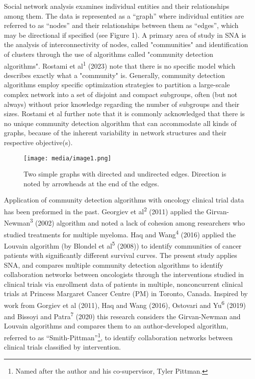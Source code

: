 \documentclass{article}
\begin{document}
Social network analysis examines individual entities and their
relationships among them. The data is represented as a ``graph'' where
individual entities are referred to as ``nodes'' and their relationships
between them as ``edges'', which may be directional if specified (see
Figure 1). A primary area of study in SNA is the analysis of
interconnectivity of nodes, called "communities" and identification of
clusters through the use of algorithms called "community detection
algorithms". Rostami et al\textsuperscript{1} (2023) note that there is
no specific model which describes exactly what a "community" is. Generally,
community detection algorithms employ specific optimization strategies
to partition a large-scale complex network into a set of disjoint and
compact subgroups, often (but not always) without prior knowledge
regarding the number of subgroups and their sizes. Rostami et al further
note that it is commonly acknowledged that there is no unique community
detection algorithm that can accommodate all kinds of graphs, because of
the inherent variability in network structures and their respective
objective(s).

\begin{figure}
\centering
\texttt{[image: media/image1.png]}
\caption{Two simple graphs with directed and
undirected edges. Direction is noted by arrowheads at the end of the
edges.}
\end{figure}

Application of community detection algorithms with oncology clinical
trial data has been preformed in the past. Georgiev et
al\textsuperscript{2} (2011) applied the
Girvan-Newman\textsuperscript{3} (2002) algorithm and noted a lack of
cohesion among researchers who studied treatments for multiple myeloma.
Haq and Wang\textsuperscript{4} (2016) applied the Louvain algorithm (by
Blondel et al\textsuperscript{5} (2008)) to identify communities of
cancer patients with significantly different survival curves. The
present study applies SNA, and compares multiple community detection
algorithms to identify collaboration networks between oncologists
through the interventions studied in clinical trials via enrollment data
of patients in multiple, nonconcurrent clinical trials at Princess Margaret Cancer Centre (PM) in Toronto, Canada. Inspired by work
from Gorgiev et al (2011), Haq and Wang (2016), Ostovari and
Yu\textsuperscript{6} (2019) and Bissoyi and Patra\textsuperscript{7}
(2020) this research considers the Girvan-Newman and Louvain algorithms
and compares them to an author-developed algorithm, referred to as
``Smith-Pittman''\footnote{Named after the author and his co-supervisor,
  Tyler Pittman.}, to identify collaboration networks between clinical
trials classified by intervention.
\end{document}
